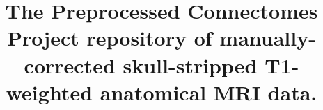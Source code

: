 \documentclass{bmcart}
\begin{document}
\begin{frontmatter}

\begin{fmbox}


\title{The Preprocessed Connectomes Project repository of manually-corrected skull-stripped T1-weighted anatomical MRI data.}


\author[
   addressref={aff1},                   %
   email={bpuccio@nki.rfmh.org}   %
]{ }
\author[addressref={aff2}]{ }
\author[addressref={aff2}]{ }
\author[addressref={aff1}]{ }
\author[
   addressref={aff1,aff2},
   email={ccraddock@nki.rfmh.org},
   corref={aff1,aff2}                       %
]{ }


\address[id=aff1]{%
  , %
  ,                     %
  ,                                %
  ,                              %
}
\address[id=aff2]{%
  ,
  ,
  ,
  ,
}


\end{fmbox}
\end{frontmatter}
\end{document}
